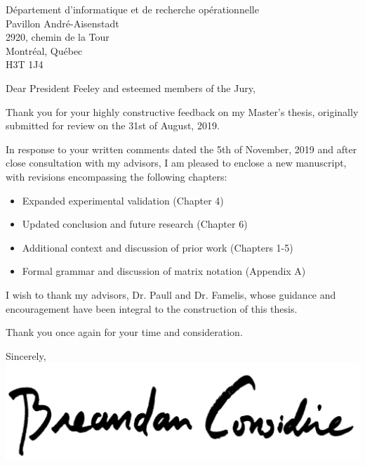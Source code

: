 \documentclass{letter}
\begin{document}
    \begin{letter}{D\'epartement d'informatique et de recherche op\'erationnelle \\ Pavillon Andr\'e-Aisenstadt \\ 2920, chemin de la Tour \\ Montr\'eal, Qu\'ebec \\ H3T 1J4}
        \opening{Dear President Feeley and esteemed members of the Jury,}
        Thank you for your highly constructive feedback on my Master's thesis, originally submitted for review on the 31st of August, 2019.

        In response to your written comments dated the 5th of November, 2019 and after close consultation with my advisors, I am pleased to enclose a new manuscript, with revisions encompassing the following chapters:

        \begin{itemize}
            \item Expanded experimental validation (Chapter 4)
            \item Updated conclusion and future research (Chapter 6)
            \item Additional context and discussion of prior work (Chapters 1-5)
            \item Formal grammar and discussion of matrix notation (Appendix A)
        \end{itemize}

        I wish to thank my advisors, Dr. Paull and Dr. Famelis, whose guidance and encouragement have been integral to the construction of this thesis.

        Thank you once again for your time and consideration.

        \closing{Sincerely,\\
            \includegraphics[scale=0.06]{signature.png}\\
        }
    \end{letter}
\end{document}
